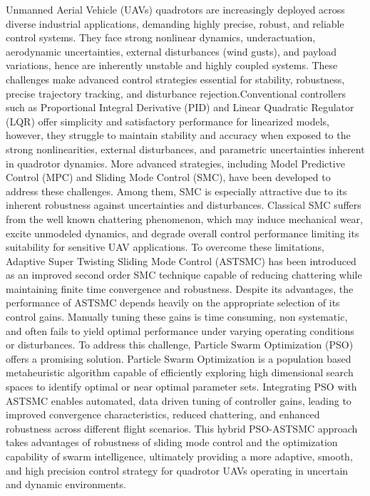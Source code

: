 Unmanned Aerial Vehicle (UAVs) quadrotors are increasingly deployed across diverse industrial applications, demanding highly precise, robust, and reliable control systems. They face strong nonlinear dynamics, underactuation, aerodynamic uncertainties, external disturbances (wind gusts), and payload variations, hence  are inherently unstable and highly coupled systems. These challenges make advanced control strategies essential for stability, robustness, precise trajectory tracking, and disturbance rejection.Conventional controllers such as Proportional Integral Derivative (PID) and Linear Quadratic Regulator (LQR) offer simplicity and satisfactory performance for linearized models, however, they struggle to maintain stability and accuracy when exposed to the strong nonlinearities, external disturbances, and parametric uncertainties inherent in quadrotor dynamics. More advanced strategies, including Model Predictive Control (MPC) and Sliding Mode Control (SMC), have been developed to address these challenges. Among them, SMC is especially attractive due to its inherent robustness against uncertainties and disturbances.
 Classical SMC suffers from the well known chattering phenomenon, which may induce mechanical wear, excite unmodeled dynamics, and degrade overall control performance limiting its suitability for sensitive UAV applications. To overcome these limitations, Adaptive Super Twisting Sliding Mode Control (ASTSMC) has been introduced as an improved second order SMC technique capable of reducing chattering while maintaining finite time convergence and robustness. Despite its advantages, the performance of ASTSMC depends heavily on the appropriate selection of its control gains. Manually tuning these gains is time consuming, non systematic, and often fails to yield optimal performance under varying operating conditions or disturbances. To address this challenge, Particle Swarm Optimization (PSO) offers a promising solution. Particle Swarm Optimization is a population based metaheuristic algorithm capable of efficiently exploring high dimensional search spaces to identify optimal or near optimal parameter sets. Integrating PSO with ASTSMC enables automated, data driven tuning of controller gains, leading to improved convergence characteristics, reduced chattering, and enhanced robustness across different flight scenarios. This hybrid PSO-ASTSMC approach takes advantages of  robustness of sliding mode control and the optimization capability of swarm intelligence, ultimately providing a more adaptive, smooth, and high precision control strategy for quadrotor UAVs operating in uncertain and dynamic environments.


